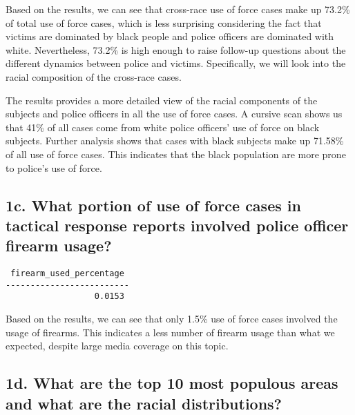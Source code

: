 \documentclass[10pt]{article}
\begin{document}
Based on the results, we can see that cross-race use of force cases make up 73.2\% of total use of force cases, which is less surprising considering the fact that victims are dominated by black people and police officers are dominated with white. Nevertheless, 73.2\% is high enough to raise follow-up questions about the different dynamics between police and victims. Specifically, we will look into the racial composition of the cross-race cases.

The results provides a more detailed view of the racial components of the subjects and police officers in all the use of force cases. A cursive scan shows us that 41\% of all cases come from white police officers' use of force on black subjects. Further analysis shows that cases with black subjects make up 71.58\% of all use of force cases. This indicates that the black population are more prone to police's use of force.


\subsection*{1c. What portion of use of force cases in tactical response reports involved police officer firearm usage?}

\begin{verbatim}
 firearm_used_percentage
-------------------------
                  0.0153
\end{verbatim}

Based on the results, we can see that only 1.5\% use of force cases involved the usage of firearms. This indicates a less number of firearm usage than what we expected, despite large media coverage on this topic.


\subsection*{1d. What are the top 10 most populous areas and what are the racial distributions?}
\end{document}
